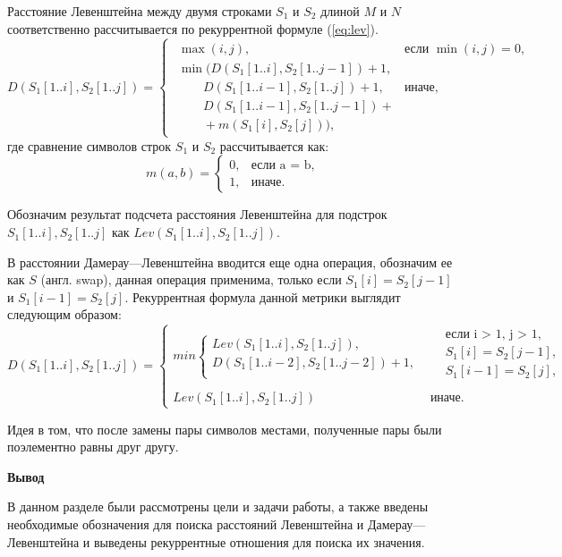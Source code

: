 Расстояние Левенштейна между двумя строками $S_{1}$ и $S_{2}$ длиной $M$ и $N$ соответственно рассчитывается по рекуррентной формуле (\ref{eq:lev}).
\small
\begin{equation}
	\label{eq:lev}
	D(S_{1}[1..i],S_{2}[1..j]) = 
	\begin{cases}
		\begin{array}{ll}
			\max(i,j), & \textrm{$\mbox{если }\min(i,j) = 0,$}\\
			\min(D(S_{1}[1..i], S_{2}[1.. j - 1])+1,\\
			\qquad D(S_{1}[1..i - 1], S_{2}[1..j]) + 1, &\textrm{$\mbox{иначе},$}\\
			\qquad D(S_{1}[1..i - 1], S_{2}[1..j - 1]) +\\
			\qquad + m(S_{1}[i],S_{2}[j])),
		\end{array}
	\end{cases}
\end{equation}
где сравнение символов строк $S_{1}$ и $S_{2}$ рассчитывается как:
\small
\begin{equation}
	\label{eq:m}
	m(a, b) = \begin{cases}
		0, &\text{если a = b,}\\
		1, &\text{иначе.}
	\end{cases}
\end{equation}


Обозначим результат подсчета расстояния Левенштейна для подстрок $S_{1}[1..i],S_{2}[1..j]$ как 
$Lev(S_{1}[1..i],S_{2}[1..j])$.





В расстоянии Дамерау---Левенштейна вводится еще одна операция, обозначим ее как $S$ (англ. swap), данная операция применима, только  если $S_{1}[i] = S_{2}[j - 1]$
и $S_{1}[i - 1] = S_{2}[j]$. Рекуррентная формула  данной метрики выглядит следующим образом:
\small
\begin{equation}
	\label{eq:DL}
	D(S_{1}[1..i],S_{2}[1..j]) = 
	\begin{cases}
		min \begin{cases}
			Lev(S_{1}[1..i],S_{2}[1..j]),\\
			D(S_{1}[1..i - 2],S_{2}[1..j - 2]) + 1, \\
		\end{cases}
		& \begin{aligned}
			& \text{если i > 1, j > 1}, \\
			& S_{1}[i] = S_{2}[j - 1], \\
			& S_{1}[i - 1] = S_{2}[j], \\
		\end{aligned}\\
		Lev(S_{1}[1..i],S_{2}[1..j])
		 & \text{иначе.}
	\end{cases}
\end{equation}

Идея в том, что после замены пары символов местами, полученные пары были поэлементно равны друг другу.

\textbf{Вывод}

В данном разделе были рассмотрены цели и задачи работы, а также введены необходимые обозначения для поиска расстояний Левенштейна и Дамерау---Левенштейна
и выведены рекуррентные отношения для поиска их значения.

